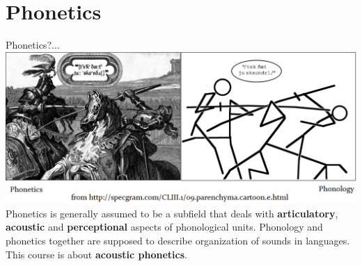 \section{Phonetics}
\begin{frame}{Phonetics?...}
\includegraphics[width=\linewidth]{03-Phonetics-vs-Phonology.png}\\
Phonetics is generally assumed to be a subfield that deals with \textbf{articulatory}, \textbf{acoustic} and \textbf{perceptional} aspects of phonological units. Phonology and phonetics together are supposed to describe organization of sounds in languages. \bigskip\\
This course is about \textbf{acoustic  phonetics}.

\end{frame}
